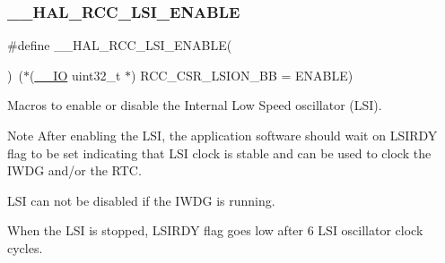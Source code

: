 \subsubsection{\texorpdfstring{\+\_\+\+\_\+\+H\+A\+L\+\_\+\+R\+C\+C\+\_\+\+L\+S\+I\+\_\+\+E\+N\+A\+B\+LE}{\_\_HAL\_RCC\_LSI\_ENABLE}}
{\footnotesize\ttfamily \#define \+\_\+\+\_\+\+H\+A\+L\+\_\+\+R\+C\+C\+\_\+\+L\+S\+I\+\_\+\+E\+N\+A\+B\+LE(\begin{DoxyParamCaption}{ }\end{DoxyParamCaption})~($\ast$(\mbox{\hyperlink{core__sc300_8h_aec43007d9998a0a0e01faede4133d6be}{\+\_\+\+\_\+\+IO}} uint32\+\_\+t $\ast$) R\+C\+C\+\_\+\+C\+S\+R\+\_\+\+L\+S\+I\+O\+N\+\_\+\+BB = E\+N\+A\+B\+LE)}



Macros to enable or disable the Internal Low Speed oscillator (L\+SI). 

\begin{DoxyNote}{Note}
After enabling the L\+SI, the application software should wait on L\+S\+I\+R\+DY flag to be set indicating that L\+SI clock is stable and can be used to clock the I\+W\+DG and/or the R\+TC. 

L\+SI can not be disabled if the I\+W\+DG is running. 

When the L\+SI is stopped, L\+S\+I\+R\+DY flag goes low after 6 L\+SI oscillator clock cycles. 
\end{DoxyNote}
